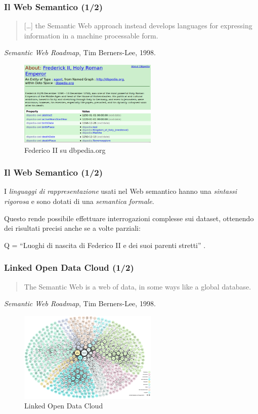 \documentclass[8pt]{beamer}
\begin{document}
\begin{frame}
\frametitle{Il Web Semantico (1/2)}
\begin{quote}
[\ldots] the Semantic Web approach instead develops languages for expressing
information in a machine processable form. 
\end{quote}
\emph{Semantic Web Roadmap}, Tim Berners-Lee, 1998.

\begin{figure}
    \includegraphics[width=250px]{federicoII_dbpedia.png} 
    \caption{Federico II su dbpedia.org}
\end{figure}
\end{frame}

\begin{frame}
\frametitle{Il Web Semantico (1/2)}
I \emph{linguaggi di rappresentazione} usati nel Web semantico 
hanno una \emph{sintassi rigorosa} e sono dotati di una \emph{semantica formale}.
\vspace{\baselineskip}

Questo rende possibile effettuare interrogazioni complesse sui dataset, 
ottenendo dei risultati precisi anche se a volte parziali:

\begin{center}
Q = “Luoghi di nascita di Federico II e dei suoi parenti stretti” . 
\end{center}
\end{frame}

\begin{frame}
\frametitle{Linked Open Data Cloud (1/2)}
\begin{quote}
The Semantic Web is a web of data, in some ways like a global database.
\end{quote}
\small{\emph{Semantic Web Roadmap}, Tim Berners-Lee, 1998.}
\begin{figure}
    \includegraphics[width=250px]{lod-cloud_colored_1000px.png} 
    \caption{Linked Open Data Cloud}
\end{figure}
\end{frame}
\end{document}
